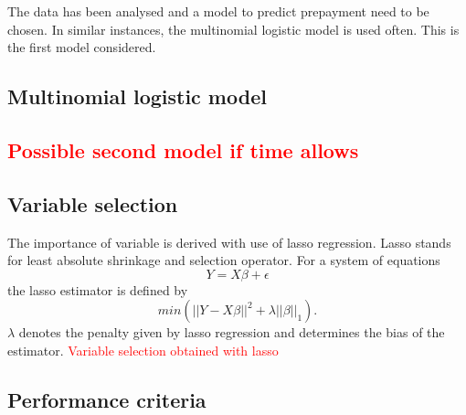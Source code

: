 The data has been analysed and a model to predict prepayment need to be chosen. In similar instances, the multinomial logistic model is used often. This is the first model considered.

\subsection{Multinomial logistic model}




\textcolor{red}{\subsection{Possible second model if time allows}}


\subsection{Variable selection}
The importance of variable is derived with use of lasso regression. Lasso stands for least absolute shrinkage and selection operator. For a system of equations $$Y=X\beta +\epsilon$$ the lasso estimator is defined by $$min(||Y-X\beta||^2+\lambda||\beta||_1).$$
$\lambda$ denotes the penalty given by lasso regression and determines the bias of the estimator. 
\textcolor{red}{Variable selection obtained with lasso}

\subsection{Performance criteria}
